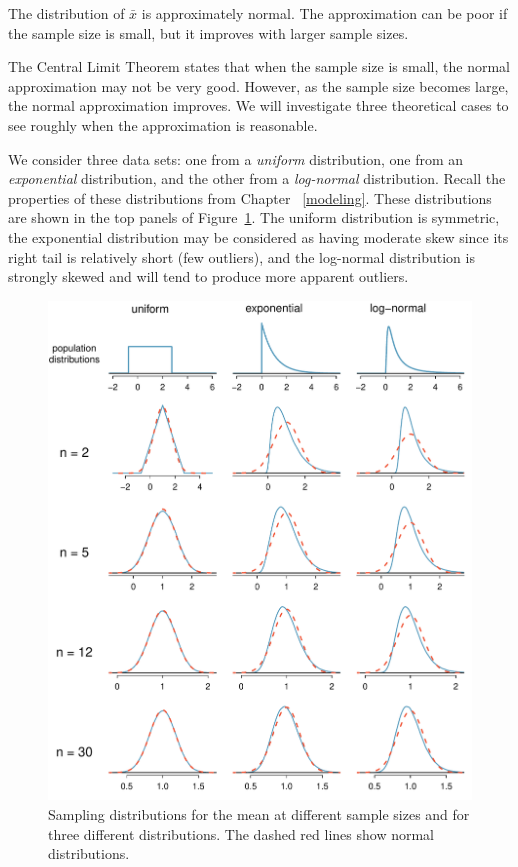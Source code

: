 \begin{termBox}{
The distribution of $\bar{x}$ is approximately normal. The approximation can be poor if the sample size is small, but it improves with larger sample sizes.}
\end{termBox}

The Central Limit Theorem states that when the sample size is small, the normal approximation may not be very good. However, as the sample size becomes large, the normal approximation improves. We will investigate three theoretical cases to see roughly when the approximation is reasonable.

We consider three data sets: one from a \emph{uniform} distribution, one from an \emph{exponential} distribution, and the other from a \emph{log-normal} distribution. Recall the properties of these distributions from Chapter ~\ref{modeling}. These distributions are shown in the top panels of Figure~\ref{cltSimulations}. The uniform distribution is symmetric, the exponential distribution may be considered as having moderate skew since its right tail is relatively short (few outliers), and the log-normal distribution is strongly skewed and will tend to produce more apparent outliers.

\begin{figure}
   \centering
   \includegraphics[width=\textwidth]{ch_inference_foundations_oi_biostat/figures/cltSimulations/cltSimulations}
   \caption{Sampling distributions for the mean at different sample sizes and for three different distributions. The dashed red lines show normal distributions.}
   \label{cltSimulations}
\end{figure}

